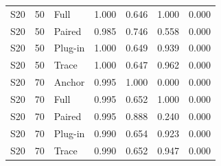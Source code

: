 \begin{longtable}{rrlrrrr}
S20 & 50 & Full & 1.000 & 0.646 & 1.000 & 0.000\\
S20 & 50 & Paired & 0.985 & 0.746 & 0.558 & 0.000\\
S20 & 50 & Plug-in & 1.000 & 0.649 & 0.939 & 0.000\\
S20 & 50 & Trace & 1.000 & 0.647 & 0.962 & 0.000\\
S20 & 70 & Anchor & 0.995 & 1.000 & 0.000 & 0.000\\
S20 & 70 & Full & 0.995 & 0.652 & 1.000 & 0.000\\
S20 & 70 & Paired & 0.995 & 0.888 & 0.240 & 0.000\\
S20 & 70 & Plug-in & 0.990 & 0.654 & 0.923 & 0.000\\
S20 & 70 & Trace & 0.990 & 0.652 & 0.947 & 0.000\\
\end{longtable}\endgroup